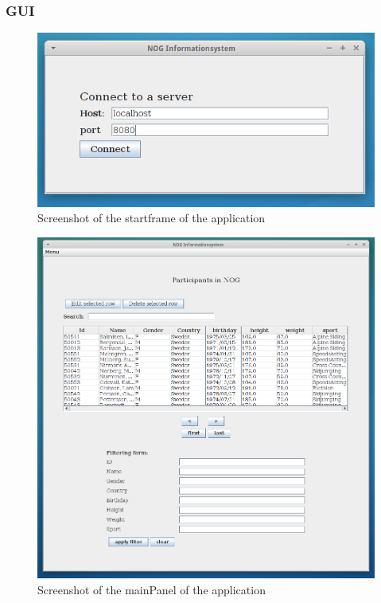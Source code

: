 \documentclass[a4paper, 11pt]{article}
\begin{document}
\subsubsection{GUI}
\begin{figure}[H]
\includegraphics[scale=0.60]{assignment1_1.png}
\caption{Screenshot of the startframe of the application}
\end{figure}
\begin{figure}[H]
\includegraphics[scale=0.40]{assignment1_2.png}
\caption{Screenshot of the mainPanel of the application}
\end{figure}
\end{document}
